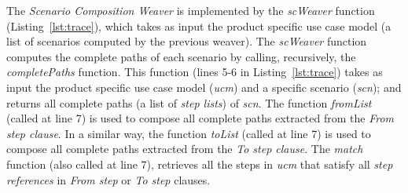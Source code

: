 \documentclass{acm_proc_article-sp}
\begin{document}


The \emph{Scenario Composition Weaver} is implemented by the \emph{scWeaver} function (Listing~\ref{lst:trace}), which takes 
as input the product specific use case model (a list of scenarios computed by the previous weaver).  
The \emph{scWeaver} function computes the complete paths of each  
scenario by calling, recursively, the \emph{completePaths} function. This 
function (lines 5-6 in Listing~\ref{lst:trace}) 
takes as input the product specific use case model (\emph{ucm}) and a specific
scenario (\emph{scn});
and returns all complete paths (a list of \emph{step lists}) of
\emph{scn}. The function \emph{fromList} (called at line 7) is used to
compose all complete paths extracted from the \emph{From step
clause}. In a similar way, the function \emph{toList} (called at
line 7) is used to compose all complete paths extracted from the
\emph{To step clause}. The \emph{match} function (also called at
line 7), retrieves all the steps in \emph{ucm} that satisfy all 
\emph{step references} in \emph{From step} or \emph{To step}
clauses. 


%  
% 
\end{document}
